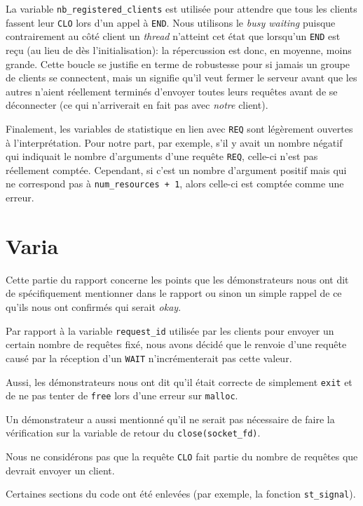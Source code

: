 \documentclass[11pt]{article}
\begin{document}
La variable \texttt{nb\_registered\_clients} est utilisée pour attendre que tous les clients fassent leur \texttt{CLO} lors d'un appel à \texttt{END}. Nous utilisons le \textit{busy waiting} puisque contrairement au côté client un \textit{thread} n'atteint cet état que lorsqu'un \texttt{END} est reçu (au lieu de dès l'initialisation): la répercussion est donc, en moyenne, moins grande. Cette boucle se justifie en terme de robustesse pour si jamais un groupe de clients se connectent, mais un signifie qu'il veut fermer le serveur avant que les autres n'aient réellement terminés d'envoyer toutes leurs requêtes avant de se déconnecter (ce qui n'arriverait en fait pas avec \textit{notre} client).

Finalement, les variables de statistique en lien avec \texttt{REQ} sont légèrement ouvertes à l'interprétation. Pour notre part, par exemple, s'il y avait un nombre négatif qui indiquait le nombre d'arguments d'une requête \texttt{REQ}, celle-ci n'est pas réellement comptée. Cependant, si c'est un nombre d'argument positif mais qui ne correspond pas à \texttt{num\_resources + 1}, alors celle-ci est comptée comme une erreur.


\section{Varia}

Cette partie du rapport concerne les points que les démonstrateurs nous ont dit de spécifiquement mentionner dans le rapport ou sinon un simple rappel de ce qu'ils nous ont confirmés qui serait \textit{okay}.

Par rapport à la variable \texttt{request\_id} utilisée par les clients pour envoyer un certain nombre de requêtes fixé, nous avons décidé que le renvoie d'une requête causé par la réception d'un \texttt{WAIT} n'incrémenterait pas cette valeur.

Aussi, les démonstrateurs nous ont dit qu'il était correcte de simplement \texttt{exit} et de ne pas tenter de \texttt{free} lors d'une erreur sur \texttt{malloc}.

Un démonstrateur a aussi mentionné qu'il ne serait pas nécessaire de faire la vérification sur la variable de retour du \texttt{close(socket\_fd)}.

Nous ne considérons pas que la requête \texttt{CLO} fait partie du nombre de requêtes que devrait envoyer un client.

Certaines sections du code ont été enlevées (par exemple, la fonction \texttt{st\_signal}).
\end{document}
